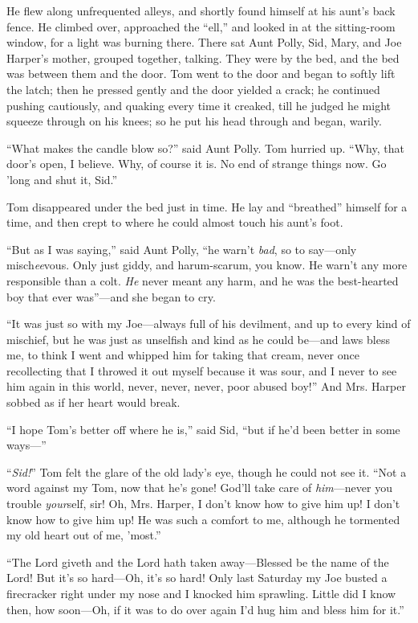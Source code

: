 \documentclass{book}
\begin{document}
He flew along unfrequented alleys, and shortly found himself at his aunt’s back fence. He climbed over, approached the “ell,” and looked in at the sitting-room window, for a light was burning there. There sat Aunt Polly, Sid, Mary, and Joe Harper’s mother, grouped together, talking. They were by the bed, and the bed was between them and the door. Tom went to the door and began to softly lift the latch; then he pressed gently and the door yielded a crack; he continued pushing cautiously, and quaking every time it creaked, till he judged he might squeeze through on his knees; so he put his head through and began, warily.

“What makes the candle blow so?” said Aunt Polly. Tom hurried up. “Why, that door’s open, I believe. Why, of course it is. No end of strange things now. Go ’long and shut it, Sid.”

Tom disappeared under the bed just in time. He lay and “breathed” himself for a time, and then crept to where he could almost touch his aunt’s foot.

“But as I was saying,” said Aunt Polly, “he warn’t \emph{bad}, so to say—only misch\emph{ee}vous. Only just giddy, and harum-scarum, you know. He warn’t any more responsible than a colt. \emph{He} never meant any harm, and he was the best-hearted boy that ever was”—and she began to cry.

“It was just so with my Joe—always full of his devilment, and up to every kind of mischief, but he was just as unselfish and kind as he could be—and laws bless me, to think I went and whipped him for taking that cream, never once recollecting that I throwed it out myself because it was sour, and I never to see him again in this world, never, never, never, poor abused boy!” And Mrs. Harper sobbed as if her heart would break.

“I hope Tom’s better off where he is,” said Sid, “but if he’d been better in some ways—”

“\emph{Sid!}” Tom felt the glare of the old lady’s eye, though he could not see it. “Not a word against my Tom, now that he’s gone! God’ll take care of \emph{him}—never you trouble \emph{your}self, sir! Oh, Mrs. Harper, I don’t know how to give him up! I don’t know how to give him up! He was such a comfort to me, although he tormented my old heart out of me, ’most.”

“The Lord giveth and the Lord hath taken away—Blessed be the name of the Lord! But it’s so hard—Oh, it’s so hard! Only last Saturday my Joe busted a firecracker right under my nose and I knocked him sprawling. Little did I know then, how soon—Oh, if it was to do over again I’d hug him and bless him for it.”
\end{document}
